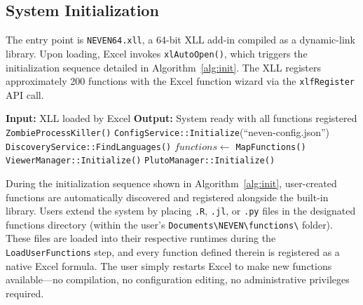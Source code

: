 \documentclass[preprint,12pt,authoryear]{elsarticle}
\providecommand{\KwInput}[1]{\textbf{Input:} #1}
\providecommand{\KwOutput}[1]{\textbf{Output:} #1}
\begin{document}
\subsection{System Initialization}
\label{subsec:initialization}

The entry point is \texttt{NEVEN64.xll}, a 64-bit XLL add-in compiled as a dynamic-link library. Upon loading, Excel invokes \texttt{xlAutoOpen()}, which triggers the initialization sequence detailed in Algorithm~\ref{alg:init}. The XLL registers approximately 200 functions with the Excel function wizard via the \texttt{xlfRegister} API call.

\begin{algorithm}[htbp]
\SetAlgoLined
\KwInput{XLL loaded by Excel}
\KwOutput{System ready with all functions registered}
\BlankLine
\texttt{ZombieProcessKiller()}
\texttt{ConfigService::Initialize}(``neven-config.json'')\;
\texttt{DiscoveryService::FindLanguages()}\;
\BlankLine
{}
\BlankLine
$functions \leftarrow$ \texttt{MapFunctions()}
\texttt{ViewerManager::Initialize()}
\texttt{PlutoManager::Initialize()}\;
\caption{System Initialization Sequence (\texttt{xlAutoOpen})}
\label{alg:init}
\end{algorithm}

During the initialization sequence shown in Algorithm~\ref{alg:init}, user-created functions are automatically discovered and registered alongside the built-in library. Users extend the system by placing \texttt{.R}, \texttt{.jl}, or \texttt{.py} files in the designated functions directory (within the user's \texttt{Documents\textbackslash NEVEN\textbackslash functions\textbackslash} folder). These files are loaded into their respective runtimes during the \texttt{LoadUserFunctions} step, and every function defined therein is registered as a native Excel formula. The user simply restarts Excel to make new functions available---no compilation, no configuration editing, no administrative privileges required.
\end{document}
